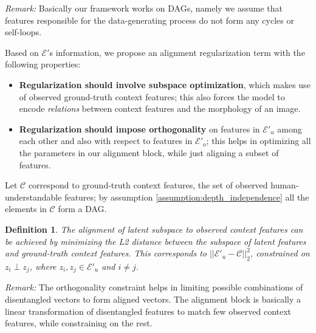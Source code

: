 \documentclass{article}
\newcommand{\ft}[1]{{\textcolor{red}{#1}}}
\newcommand{\ftcom}[2][]{\todo[author=FT, #1]{#2}}
\newtheorem{dfn}{Definition}
\begin{document}
\textit{Remark:} Basically our framework works on DAGs, namely we assume that features responsible for the data-generating process do not form any cycles or self-loops.

Based on $\mathcal{E}'$s information, we propose an alignment regularization term with the following properties:
\begin{itemize}
    \item \textbf{Regularization should involve subspace optimization}, which makes use of observed ground-truth context features; this also forces the model to encode \textit{relations} between context features and the morphology of an image.%
    \item \textbf{Regularization should impose orthogonality} on features in $\mathcal{E}'_u$ among each other and also with respect to features in $\mathcal{E}'_o$; this helps in optimizing all the parameters in our alignment block, while just aligning a subset of features.
\end{itemize}

Let $\mathcal{C}$ correspond to ground-truth context features, the set of observed human-understandable features; by assumption \ref{assumption:depth_independence} all the elements in $\mathcal{C}$ form a DAG.


\begin{dfn}
The alignment of latent subspace to observed context features can be achieved by minimizing the L2 distance between the subspace of latent features and ground-truth context features.
This corresponds to $||\mathcal{E}'_u - \mathcal{C}||^2_2$, constrained on $z_i \perp z_j$, where $z_i, z_j \in \mathcal{E}'_u$ and $i \neq j$.
\end{dfn}

\textit{Remark:} The orthogonality constraint helps in limiting possible combinations of disentangled vectors to form aligned vectors. 
The alignment block is basically a linear transformation of disentangled features to match few observed context features, while  constraining on the rest.
\end{document}
